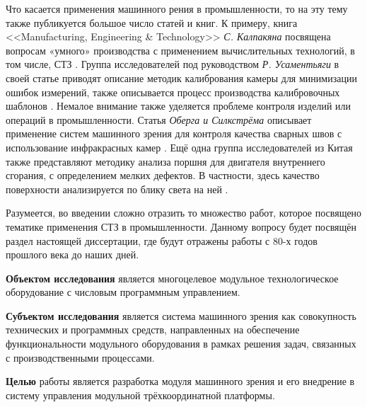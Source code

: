 Что касается применения машинного рения в промышленности, то на эту тему также публикуется большое число статей и книг. К примеру, книга
<<Manufacturing, Engineering \& Technology>> \textit{С. Калпакяна} посвящена вопросам «умного» производства с применением вычислительных технологий, в том числе, СТЗ \cite{Kalpakjian}. Группа исследователей под руководством \textit{Р. Усаментьяги} в своей статье приводят описание методик калибрования камеры для минимизации ошибок измерений, также описывается процесс производства калибровочных шаблонов \cite{Usamentiaga2017}. Немалое внимание также уделяется проблеме контроля изделий или операций в промышленности. Статья \textit{Оберга и Силкстрёма} описывает применение систем машинного зрения для контроля качества сварных швов с использование инфракрасных камер \cite{Oberg2017}. Ещё одна группа исследователей из Китая также представляют методику анализа поршня для двигателя внутреннего сгорания, с определением мелких дефектов. В частности, здесь качество поверхности анализируется по блику света на ней \cite{Xu2017}.

Разумеется, во введении сложно отразить то множество работ, которое посвящено тематике применения СТЗ в промышленности. Данному вопросу будет посвящён раздел \cite{sect1_3} настоящей диссертации, где будут отражены работы с 80-х годов прошлого века до наших дней. 

\textbf{Объектом исследования} является многоцелевое модульное технологическое оборудование с числовым программным управлением.

\textbf{Субъектом исследования} является система машинного зрения как совокупность технических и программных средств, направленных на обеспечение функциональности модульного оборудования в рамках решения задач, связанных с производственными процессами.

\textbf{Целью} работы является разработка модуля машинного зрения и его внедрение в систему управления модульной трёхкоординатной платформы.

